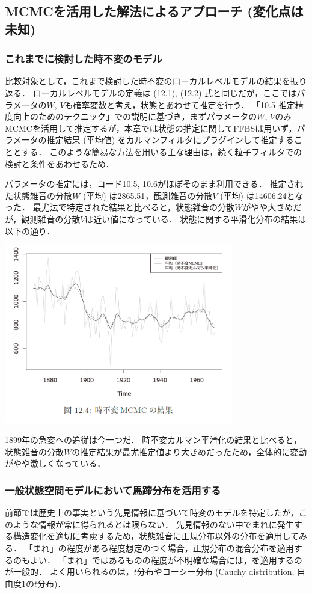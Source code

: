 \documentclass[11pt,a4paper]{jsarticle}
\numberwithin{equation}{section}
\begin{document}
\subsection{MCMCを活用した解法によるアプローチ (変化点は未知)}

\subsubsection{これまでに検討した時不変のモデル}
比較対象として，これまで検討した時不変のローカルレベルモデルの結果を振り返る．
ローカルレベルモデルの定義は (12.1), (12.2) 式と同じだが，ここではパラメータの$W$, $V$も確率変数と考え，状態とあわせて推定を行う．
「10.5 推定精度向上のためのテクニック」での説明に基づき，まずパラメータの$W$, $V$のみMCMCを活用して推定するが，本章では状態の推定に関してFFBSは用いず，パラメータの推定結果 (平均値) をカルマンフィルタにプラグインして推定することとする．
このような簡易な方法を用いる主な理由は，続く粒子フィルタでの検討と条件をあわせるため．

パラメータの推定には，コード10.5, 10.6がほぼそのまま利用できる．
推定された状態雑音の分散$W$ (平均) は2865.51，観測雑音の分散$V$ (平均) は14606.24となった．
最尤法で特定された結果と比べると，状態雑音の分散$W$がやや大きめだが，観測雑音の分散$V$は近い値になっている．
状態に関する平滑化分布の結果は以下の通り．
\begin{center}
\includegraphics[width=10cm]{img/Figure12_4.png}
\end{center}

1899年の急変への追従は今一つだ．
時不変カルマン平滑化の結果と比べると，状態雑音の分散$W$の推定結果が最尤推定値より大きめだったため，全体的に変動がやや激しくなっている．

\subsubsection{一般状態空間モデルにおいて馬蹄分布を活用する}
前節では歴史上の事実という先見情報に基づいて時変のモデルを特定したが，このような情報が常に得られるとは限らない．
先見情報のない中でまれに発生する構造変化を適切に考慮するため，状態雑音に正規分布以外の分布を適用してみる．
「まれ」の程度がある程度想定のつく場合，正規分布の混合分布を適用するのもよい．
「まれ」ではあるものの程度が不明確な場合には，を適用するのが一般的．
よく用いられるのは，$t$分布やコーシー分布 (Cauchy distribution, 自由度1の$t$分布)．
\end{document}
